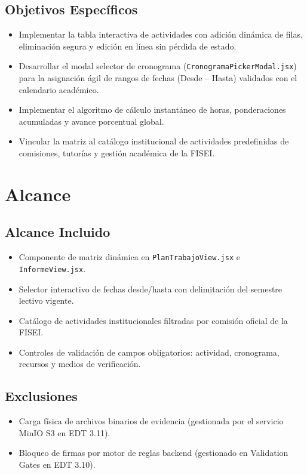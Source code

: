 \documentclass[12pt,a4paper]{article}
\begin{document}
\subsection{Objetivos Específicos}
\begin{itemize}[leftmargin=1.5em, itemsep=1.5pt]
    \item Implementar la tabla interactiva de actividades con adición dinámica de filas, eliminación segura y edición en línea sin pérdida de estado.
    \item Desarrollar el modal selector de cronograma (\texttt{CronogramaPickerModal.jsx}) para la asignación ágil de rangos de fechas (Desde -- Hasta) validados con el calendario académico.
    \item Implementar el algoritmo de cálculo instantáneo de horas, ponderaciones acumuladas y avance porcentual global.
    \item Vincular la matriz al catálogo institucional de actividades predefinidas de comisiones, tutorías y gestión académica de la FISEI.
\end{itemize}

\section{Alcance}

\subsection{Alcance Incluido}
\begin{itemize}[leftmargin=1.5em, itemsep=1.5pt]
    \item Componente de matriz dinámica en \texttt{PlanTrabajoView.jsx} e \texttt{InformeView.jsx}.
    \item Selector interactivo de fechas desde/hasta con delimitación del semestre lectivo vigente.
    \item Catálogo de actividades institucionales filtradas por comisión oficial de la FISEI.
    \item Controles de validación de campos obligatorios: actividad, cronograma, recursos y medios de verificación.
\end{itemize}

\subsection{Exclusiones}
\begin{itemize}[leftmargin=1.5em, itemsep=1.5pt]
    \item Carga física de archivos binarios de evidencia (gestionada por el servicio MinIO S3 en EDT 3.11).
    \item Bloqueo de firmas por motor de reglas backend (gestionado en Validation Gates en EDT 3.10).
\end{itemize}
\end{document}
